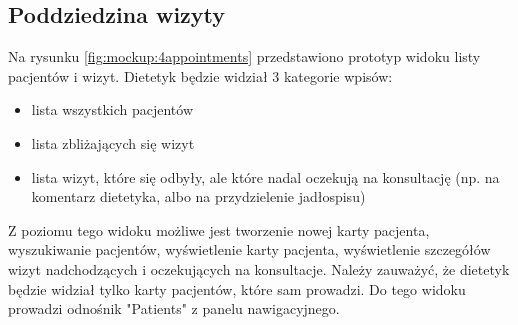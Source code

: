 







\subsection{Poddziedzina wizyty}

Na rysunku \ref{fig:mockup:4appointments} przedstawiono prototyp widoku listy pacjentów i wizyt.
Dietetyk będzie widział 3 kategorie wpisów:
\begin{itemize}
    \item lista wszystkich pacjentów
    \item lista zbliżających się wizyt
    \item lista wizyt, które się odbyły, ale które nadal oczekują na konsultację (np. na komentarz dietetyka, albo na przydzielenie jadłospisu)
\end{itemize}
Z poziomu tego widoku możliwe jest tworzenie nowej karty pacjenta, wyszukiwanie pacjentów, wyświetlenie karty pacjenta, wyświetlenie szczegółów wizyt nadchodzących i oczekujących na konsultacje.
Należy zauważyć, że dietetyk będzie widział tylko karty pacjentów, które sam prowadzi.
Do tego widoku prowadzi odnośnik "Patients" z panelu nawigacyjnego.

